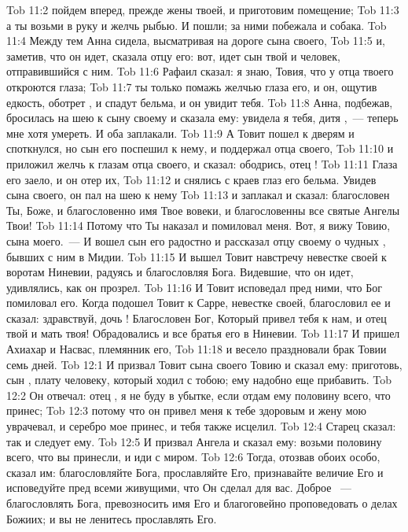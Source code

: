 \vs Tob 11:2 пойдем вперед, прежде жены твоей, и приготовим помещение;
\vs Tob 11:3 а ты возьми в руку и желчь рыбью. И пошли; за ними побежала и собака.
\rsbpar\vs Tob 11:4 Между тем Анна сидела, высматривая на дороге сына своего,
\vs Tob 11:5 и, заметив, что он идет, сказала отцу его: вот, идет сын твой и человек, отправившийся с ним.
\vs Tob 11:6 Рафаил сказал: я знаю, Товия, что у отца твоего откроются глаза;
\vs Tob 11:7 ты только помажь желчью глаза его, и он, ощутив едкость, оботрет , и спадут бельма, и он увидит тебя.
\vs Tob 11:8 Анна, подбежав, бросилась на шею к сыну своему и сказала ему: увидела я тебя, дитя ,~--- теперь мне хотя умереть. И оба заплакали.
\vs Tob 11:9 А Товит пошел к дверям и споткнулся, но сын его поспешил к нему, и поддержал отца своего,
\vs Tob 11:10 и приложил желчь к глазам отца своего, и сказал: ободрись, отец !
\vs Tob 11:11 Глаза его заело, и он отер их,
\vs Tob 11:12 и снялись с краев глаз его бельма. Увидев сына своего, он пал на шею к нему
\vs Tob 11:13 и заплакал и сказал: благословен Ты, Боже, и благословенно имя Твое вовеки, и благословенны все святые Ангелы Твои!
\vs Tob 11:14 Потому что Ты наказал и помиловал меня. Вот, я вижу Товию, сына моего.~--- И вошел сын его радостно и рассказал отцу своему о чудных , бывших с ним в Мидии.
\vs Tob 11:15 И вышел Товит навстречу невестке своей к воротам Ниневии, радуясь и благословляя Бога. Видевшие, что он идет, удивлялись, как он прозрел.
\vs Tob 11:16 И Товит исповедал пред ними, что Бог помиловал его. Когда подошел Товит к Сарре, невестке своей, благословил ее и сказал: здравствуй, дочь ! Благословен Бог, Который привел тебя к нам, и  отец твой и мать твоя! Обрадовались и все братья его в Ниневии.
\vs Tob 11:17 И пришел Ахиахар и Насвас, племянник его,
\vs Tob 11:18 и весело праздновали брак Товии семь дней.
\vs Tob 12:1 И призвал Товит сына своего Товию и сказал ему: приготовь, сын , плату человеку, который ходил с тобою; ему надобно еще прибавить.
\vs Tob 12:2 Он отвечал: отец , я не буду в убытке, если отдам ему половину всего, что принес;
\vs Tob 12:3 потому что он привел меня к тебе здоровым и жену мою уврачевал, и серебро мое принес, и тебя также исцелил.
\vs Tob 12:4 Старец сказал: так и следует ему.
\vs Tob 12:5 И призвал Ангела и сказал ему: возьми половину всего, что вы принесли, и иди с миром.
\rsbpar\vs Tob 12:6 Тогда, отозвав обоих особо,  сказал им: благословляйте Бога, прославляйте Его, признавайте величие Его и исповедуйте пред всеми живущими, что Он сделал для вас. Доброе ~--- благословлять Бога, превозносить имя Его и благоговейно проповедовать о делах Божиих; и вы не ленитесь прославлять Его.

